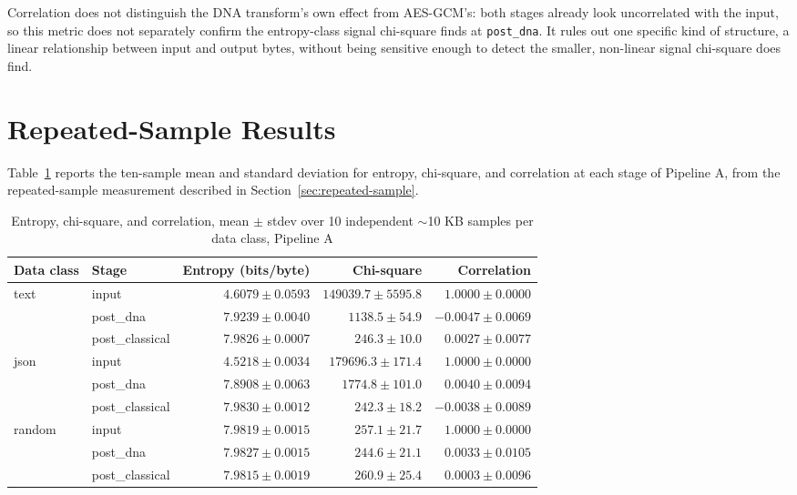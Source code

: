 \documentclass[12pt,a4paper,twoside]{report}
\numberwithin{equation}{chapter}
\begin{document}
Correlation does not distinguish the DNA transform's own effect from
AES-GCM's: both stages already look uncorrelated with the input, so
this metric does not separately confirm the entropy-class signal
chi-square finds at \texttt{post\_dna}. It rules out one specific kind
of structure, a linear relationship between input and output bytes,
without being sensitive enough to detect the smaller, non-linear signal
chi-square does find.

\section{Repeated-Sample Results}
\label{sec:results-repeated-sample}
Table~\ref{tab:results-repeated-sample} reports the ten-sample mean and
standard deviation for entropy, chi-square, and correlation at each
stage of Pipeline A, from the repeated-sample measurement described in
Section~\ref{sec:repeated-sample}.

\begin{table}[h]
\centering
\caption{Entropy, chi-square, and correlation, mean $\pm$ stdev over 10 independent $\sim$10 KB samples per data class, Pipeline A}
\label{tab:results-repeated-sample}
\begin{tabular}{llrrr}
\toprule
Data class & Stage & Entropy (bits/byte) & Chi-square & Correlation \\
\midrule
text & input & $4.6079 \pm 0.0593$ & $149039.7 \pm 5595.8$ & $1.0000 \pm 0.0000$ \\
 & post\_dna & $7.9239 \pm 0.0040$ & $1138.5 \pm 54.9$ & $-0.0047 \pm 0.0069$ \\
 & post\_classical & $7.9826 \pm 0.0007$ & $246.3 \pm 10.0$ & $0.0027 \pm 0.0077$ \\
json & input & $4.5218 \pm 0.0034$ & $179696.3 \pm 171.4$ & $1.0000 \pm 0.0000$ \\
 & post\_dna & $7.8908 \pm 0.0063$ & $1774.8 \pm 101.0$ & $0.0040 \pm 0.0094$ \\
 & post\_classical & $7.9830 \pm 0.0012$ & $242.3 \pm 18.2$ & $-0.0038 \pm 0.0089$ \\
random & input & $7.9819 \pm 0.0015$ & $257.1 \pm 21.7$ & $1.0000 \pm 0.0000$ \\
 & post\_dna & $7.9827 \pm 0.0015$ & $244.6 \pm 21.1$ & $0.0033 \pm 0.0105$ \\
 & post\_classical & $7.9815 \pm 0.0019$ & $260.9 \pm 25.4$ & $0.0003 \pm 0.0096$ \\
\bottomrule
\end{tabular}
\end{table}
\end{document}
